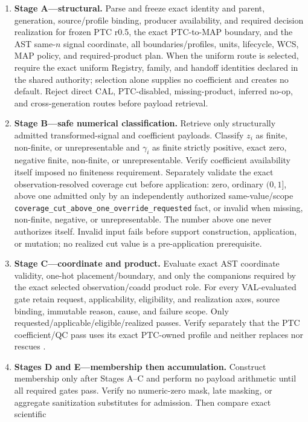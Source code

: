 \documentclass[10pt]{article}
\newcommand{\code}[1]{\nolinkurl{#1}}
\begin{document}
\begin{enumerate}
\item \textbf{Stage A---structural.} Parse and freeze exact identity and
parent, generation, source/profile binding, producer availability, and
required decision realization for frozen PTC r0.5, the exact PTC-to-MAP
boundary, and the AST same-\(n\) signal
coordinate, all boundaries/profiles, units, lifecycle, WCS, MAP policy, and
required-product plan.  When the uniform route is selected, require the exact
uniform Registry, family, and handoff identities declared in the shared
authority; selection alone supplies no coefficient and creates no default.
Reject direct CAL, PTC-disabled, missing-product,
inferred no-op, and cross-generation routes before payload retrieval.
\item \textbf{Stage B---safe numerical classification.} Retrieve only
structurally admitted transformed-signal and coefficient payloads. Classify
\(z_i\) as finite, non-finite, or unrepresentable and \(\gamma_i\) as finite
strictly positive, exact zero, negative finite, non-finite, or
unrepresentable. Verify coefficient availability itself imposed no finiteness
requirement. Separately validate the exact observation-resolved coverage cut
before application: zero, ordinary \((0,1]\), above one admitted only by an
independently authorized same-value/scope
\code{coverage_cut_above_one_override_requested} fact, or invalid when
missing, non-finite, negative, or unrepresentable. The number above one never
authorizes itself. Invalid input fails before support construction, application,
or mutation; no realized cut value is a pre-application prerequisite.
\item \textbf{Stage C---coordinate and product.} Evaluate exact AST coordinate
validity, one-hot placement/boundary, and only the companions required by the
exact selected observation/coadd product role.
For every VAL-evaluated gate retain request, applicability, eligibility, and
realization axes, source binding, immutable reason, cause, and failure scope.
Only requested/applicable/eligible/realized passes. Verify separately that the
PTC coefficient/QC pass uses its exact PTC-owned profile and neither replaces
nor rescues \SCIMapUpstreamProfile.
\item \textbf{Stages D and E---membership then accumulation.} Construct
membership only after Stages A--C and perform no payload arithmetic until all
required gates pass. Verify no numeric-zero mask, late masking, or aggregate
sanitization substitutes for admission. Then compare exact scientific

\end{enumerate}
\end{document}
